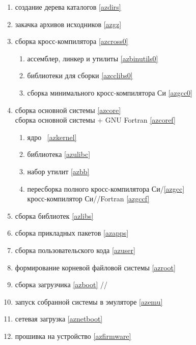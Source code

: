 \bigskip
\begin{enumerate}[nosep]
  \item {} создание дерева каталогов \ref{azdirs}
  \item {} закачка архивов исходников \ref{azgz}
  \item {} сборка кросс-компилятора \ref{azcross0}
  \begin{enumerate}[nosep]
    \item {} ассемблер, линкер и утилиты \ref{azbinutils0}
    \item {} библиотеки для сборки  \ref{azcclibs0}
    \item {} сборка минимального кросс-компилятора Си \ref{azgcc0}
  \end{enumerate}
  \item {} сборка основной системы \ref{azcore}
  \\  сборка основной системы + GNU Fortran \ref{azcoref}
  \begin{enumerate}[nosep]
    \item {} ядро \linux\ \ref{azkernel}
    \item {} библиотека  \ref{azulibc}
    \item {} набор утилит  \ref{azbb}
    \item {} пересборка полного кросс-компилятора Си/\cpp \ref{azgcc}
    \\  кросс-компилятор Си/\cpp/Fortran \ref{azgccf}
  \end{enumerate}
  \item {} сборка библиотек  \ref{azlibs}
  \item {} сборка прикладных пакетов  \ref{azapps}
  \item {} сборка пользовательского кода \ref{azuser}
  \item {} формирование корневой файловой системы \ref{azroot}
  \item {} сборка загрузчика \ref{azboot}
   //
  \item {} запуск собранной системы в эмуляторе \ref{azemu}
  \item {} сетевая загрузка \ref{aznetboot}
  \item {} прошивка на устройство \ref{azfirmware}
\end{enumerate}

